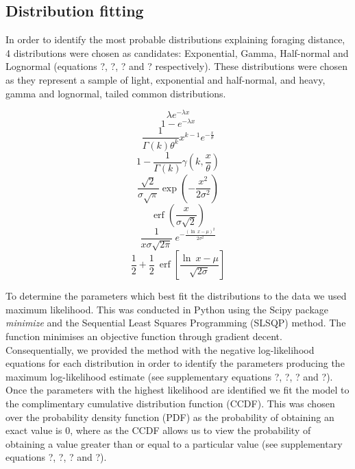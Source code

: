 \documentclass[11pt,usenames,dvipsnames]{article}
\DeclareMathOperator\erf{erf}
\begin{document}
\subsection{Distribution fitting}

In order to identify the most probable distributions explaining foraging distance, 4 distributions were chosen as candidates: Exponential, Gamma, Half-normal and Lognormal (equations ?, ?, ? and ? respectively). These distributions were chosen as they represent a sample of light, exponential and half-normal, and heavy, gamma and lognormal, tailed common distributions.

\begin{equation}
\lambda e^{-\lambda x}
\end{equation}
\begin{equation}
1 - e^{-\lambda x}
\end{equation}
\begin{equation}
\frac{1}{\Gamma(k)\theta^k}x^{k-1}e^{-\frac{x}{\theta}}
\end{equation}
\begin{equation}
1 - \frac{1}{\Gamma(k)}\gamma(k,\frac{x}{\theta})
\end{equation}
\begin{equation}
\frac{\sqrt{2}}{\sigma \sqrt{\pi}} \exp \left(-\frac{x^2}{2 \sigma^2}\right)
\end{equation}
\begin{equation}
\erf\left(\frac{x}{\sigma \sqrt{2}}\right)
\end{equation}
\begin{equation}
\frac{1}{x \sigma \sqrt{2 \pi}}\ e^{- \frac{(\ln\ x - \mu)^2}{2\sigma^2}}
\end{equation}
\begin{equation}
\frac{1}{2} + \frac{1}{2}\ \erf\left[\frac{\ln\ x - \mu}{\sqrt{2 \sigma}}\right]
\end{equation}

To determine the parameters which best fit the distributions to the data we used maximum likelihood. This was conducted in Python using the Scipy package \textit{minimize} and the Sequential Least Squares Programming (SLSQP) method. The function minimises an objective function through gradient decent. Consequentially, we provided the method with the negative log-likelihood equations for each distribution in order to identify the parameters producing the maximum log-likelihood estimate (see supplementary equations ?, ?, ? and ?). Once the parameters with the highest likelihood are identified we fit the model to the complimentary cumulative distribution function (CCDF). This was chosen over the probability density function (PDF) as the probability of obtaining an exact value is 0, where as the CCDF allows us to view the probability of obtaining a value greater than or equal to a particular value (see supplementary equations ?, ?, ? and ?). 
\end{document}
